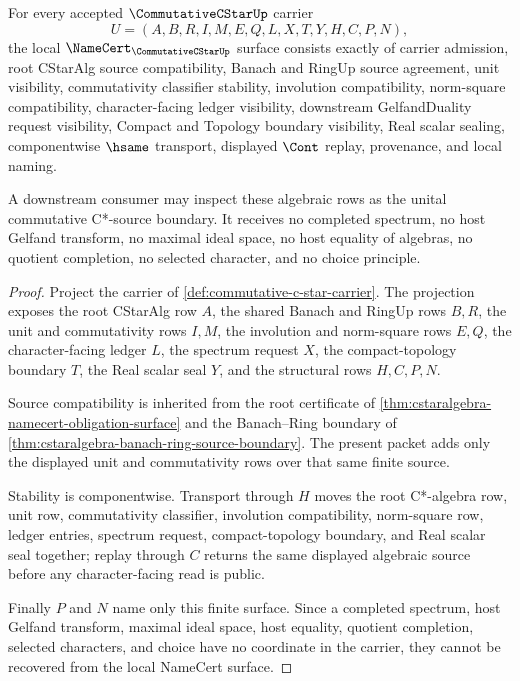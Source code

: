 \begin{theorem}
\label{thm:commutative-c-star-namecert-obligations}
For every accepted $\CommutativeCStarUp$ carrier
$$
U=(A,B,R,I,M,E,Q,L,X,T,Y,H,C,P,N),
$$
the local $\NameCert_{\CommutativeCStarUp}$ surface consists exactly of carrier admission, root CStarAlg source compatibility, Banach and RingUp source agreement, unit visibility, commutativity classifier stability, involution compatibility, norm-square compatibility, character-facing ledger visibility, downstream GelfandDuality request visibility, Compact and Topology boundary visibility, Real scalar sealing, componentwise $\hsame$ transport, displayed $\Cont$ replay, provenance, and local naming.

A downstream consumer may inspect these algebraic rows as the unital commutative C*-source boundary. It receives no completed spectrum, no host Gelfand transform, no maximal ideal space, no host equality of algebras, no quotient completion, no selected character, and no choice principle.
\end{theorem}
\begin{proof}
Project the carrier of \autoref{def:commutative-c-star-carrier}. The projection exposes the root CStarAlg row $A$, the shared Banach and RingUp rows $B,R$, the unit and commutativity rows $I,M$, the involution and norm-square rows $E,Q$, the character-facing ledger $L$, the spectrum request $X$, the compact-topology boundary $T$, the Real scalar seal $Y$, and the structural rows $H,C,P,N$.

Source compatibility is inherited from the root certificate of \autoref{thm:cstaralgebra-namecert-obligation-surface} and the Banach--Ring boundary of \autoref{thm:cstaralgebra-banach-ring-source-boundary}. The present packet adds only the displayed unit and commutativity rows over that same finite source.

Stability is componentwise. Transport through $H$ moves the root C*-algebra row, unit row, commutativity classifier, involution compatibility, norm-square row, ledger entries, spectrum request, compact-topology boundary, and Real scalar seal together; replay through $C$ returns the same displayed algebraic source before any character-facing read is public.

Finally $P$ and $N$ name only this finite surface. Since a completed spectrum, host Gelfand transform, maximal ideal space, host equality, quotient completion, selected characters, and choice have no coordinate in the carrier, they cannot be recovered from the local NameCert surface.
\end{proof}

